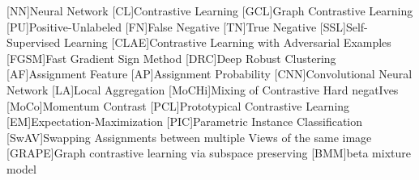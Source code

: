 \begin{acronym}

    [NN]{Neural Network}
    [CL]{Contrastive Learning}
    [GCL]{Graph Contrastive Learning}
    [PU]{Positive-Unlabeled}
    [FN]{False Negative}
    [TN]{True Negative}
    [SSL]{Self-Supervised Learning}
    [CLAE]{Contrastive Learning with Adversarial Examples}
    [FGSM]{Fast Gradient Sign Method}
    [DRC]{Deep Robust Clustering}
    [AF]{Assignment Feature}
    [AP]{Assignment Probability}
    [CNN]{Convolutional Neural Network}
    [LA]{Local Aggregation}
    [MoCHi]{Mixing of Contrastive Hard negatIves}
    [MoCo]{Momentum Contrast}
    [PCL]{Prototypical Contrastive Learning}
    [EM]{Expectation-Maximization}
    [PIC]{Parametric Instance Classification}
    [SwAV]{Swapping Assignments between multiple Views of the same image}
    [GRAPE]{Graph contrastive learning via subspace preserving}
    [BMM]{beta mixture model}


\end{acronym}